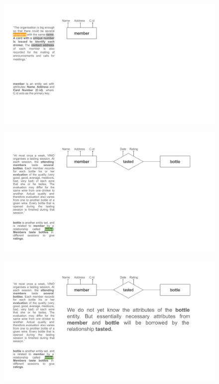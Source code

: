 \documentclass{beamer}
\begin{document}
\begin{frame}
    \begin{figure}
        \centering
        \includegraphics[width=1.1\linewidth]{tut_02_files/01.pdf}
    \end{figure}
\end{frame}

\begin{frame}
    \begin{figure}
        \centering
        \includegraphics[width=1.1\linewidth]{tut_02_files/02.pdf}
    \end{figure}
\end{frame}

\begin{frame}
    \begin{figure}
        \centering
        \includegraphics[width=1.1\linewidth]{tut_02_files/03.pdf}
    \end{figure}
\end{frame}
\end{document}
